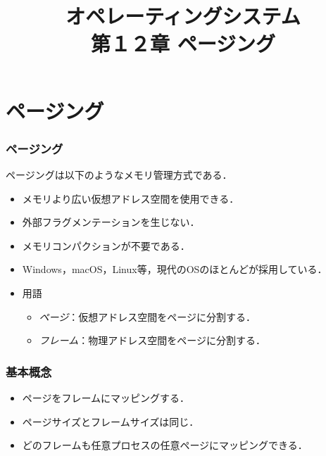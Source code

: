\documentclass{beamer}                   %
\begin{document}
\title[主記憶]{オペレーティングシステム\\第１２章 ページング}
\date{}

\begin{frame}
  \titlepage
\end{frame}


\section{ページング}
\begin{frame}
  \frametitle{ページング}
  ページングは以下のようなメモリ管理方式である．
  \begin{itemize}
  \item メモリより広い仮想アドレス空間を使用できる．
  \item 外部フラグメンテーションを生じない．
  \item メモリコンパクションが不要である．
  \item Windows，macOS，Linux等，現代のOSのほとんどが採用している．
  \item 用語
    \begin{itemize}
      \item \emph{ページ}：仮想アドレス空間をページに分割する．
      \item \emph{フレーム}：物理アドレス空間をページに分割する．
    \end{itemize}
  \end{itemize}
\end{frame}

\begin{frame}
  \frametitle{基本概念}
  \begin{itemize}
  \item ページをフレームにマッピングする．
  \item ページサイズとフレームサイズは同じ．
  \item どのフレームも任意プロセスの任意ページにマッピングできる．
  \end{itemize}
\end{frame}
\end{document}

